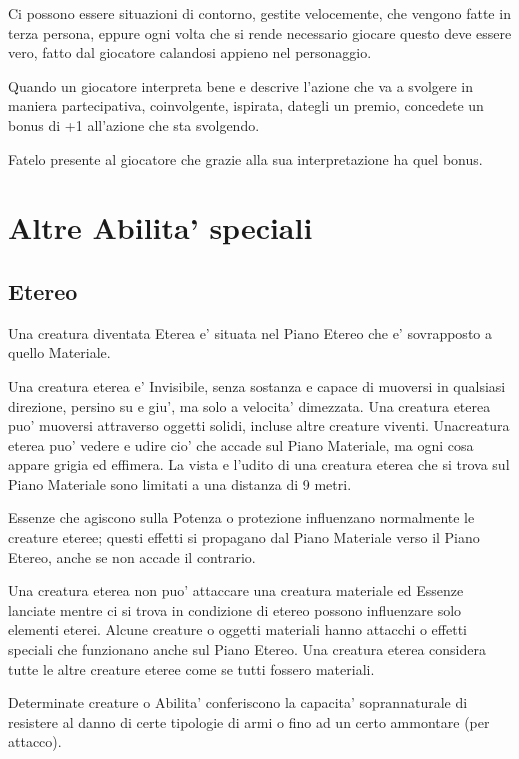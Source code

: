 \documentclass[a4paper,11pt,twoside,openany]{dndbook}
\begin{document}
Ci possono essere situazioni di contorno, gestite velocemente, che vengono fatte in terza persona, eppure ogni volta che si rende necessario giocare questo deve essere vero, fatto dal giocatore calandosi appieno nel personaggio.

Quando un giocatore interpreta bene e descrive l'azione che va a svolgere in maniera partecipativa, coinvolgente, ispirata, dategli un premio, concedete un bonus di +1 all'azione che sta svolgendo.

Fatelo presente al giocatore che grazie alla sua interpretazione ha quel bonus.

\pagebreak

\section{Altre Abilita' speciali}

\label{altre-abilita-speciali}

\subsection{Etereo}

\label{etereo}

Una creatura diventata Eterea e' situata nel Piano Etereo che e' sovrapposto a quello Materiale.

Una creatura eterea e' Invisibile, senza sostanza e capace di muoversi in qualsiasi direzione, persino su e giu', ma solo a velocita' dimezzata. Una creatura eterea puo' muoversi attraverso oggetti solidi, incluse altre creature viventi. Unacreatura eterea puo' vedere e udire cio' che accade sul Piano Materiale, ma ogni cosa appare grigia ed effimera. La vista e l'udito di una creatura eterea che si trova sul Piano Materiale sono limitati a una distanza di 9 metri.

Essenze che agiscono sulla Potenza o protezione influenzano normalmente le creature eteree; questi effetti si propagano dal Piano Materiale verso il Piano Etereo, anche se non accade il contrario.

Una creatura eterea non puo' attaccare una creatura materiale ed Essenze lanciate mentre ci si trova in condizione di etereo possono influenzare solo elementi eterei. Alcune creature o oggetti materiali hanno attacchi o effetti speciali che funzionano anche sul Piano Etereo. Una creatura eterea considera tutte le altre creature eteree come se tutti fossero materiali.


Determinate creature o Abilita' conferiscono la capacita' soprannaturale di resistere al danno di certe tipologie di armi o fino ad un certo ammontare (per attacco).
\end{document}
